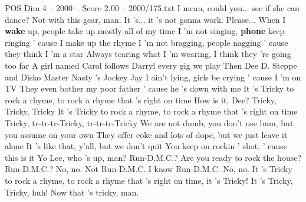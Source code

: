 \begin{textsample}{POS Dim 4 – 2000 – Score 2.00 – 2000/175.txt}
I mean, could you... see if she can dance?
Not with this gear, man.
It 's... it 's not gonna work.
Please...
When I \textbf{wake} up, people take up mostly all of my time I 'm not singing, \textbf{phone} keep ringing ' cause I make up the rhyme I 'm not bragging, people nagging ' cause they think I 'm a star Always tearing what I 'm wearing, I think they 're going too far A girl named Carol follows Darryl every gig we play Then Dee D.
Steppe and Disko Master Nasty 's Jockey Jay I ain't lying, girls be crying ' cause I 'm on TV They even bother my poor father ' cause he 's down with me It 's Tricky to rock a rhyme, to rock a rhyme that 's right on time How is it, Dee?
Tricky, Tricky, Tricky It 's Tricky to rock a rhyme, to rock a rhyme that 's right on time Tricky, tr-tr-tr-Tricky, tr-tr-tr-Tricky We are not dumb, you don't use bum, but you assume on your own They offer coke and lots of dope, but we just leave it alone It 's like that, y'all, but we don't quit You keep on rockin ' shot, ' cause this is it Yo Lee, who 's up, man?
Run-D.M.C.?
Are you ready to rock the house?
Run-D.M.C.?
No, no.
Not Run-D.M.C.
I know Run-D.M.C.
No, no.
It 's Tricky to rock a rhyme, to rock a rhyme that 's right on time, it 's Tricky!
It 's Tricky, Tricky, huh!
Now that 's tricky, man.

\end{textsample}
